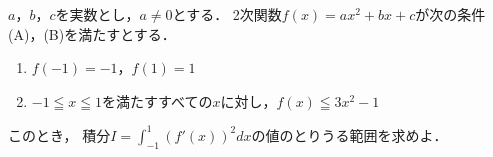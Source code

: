 \documentclass[../../main.tex]{subfiles}
\begin{document}
$a$，$b$，$c$を実数とし，$a \neq 0$とする．
2次関数$f(x)=ax^2+bx+c$が次の条件(A)，(B)を満たすとする．
\begin{enumerate}
  \item[(A)] $f(-1)=-1$，$f(1)=1$
  \item[(B)] $-1 \leqq x \leqq 1$を満たすすべての$x$に対し，$f(x) \leqq 3x^2-1$
\end{enumerate}
このとき，
積分$\displaystyle I=\int_{-1}^1 (f'(x))^2 dx$の値のとりうる範囲を求めよ．
\end{document}
